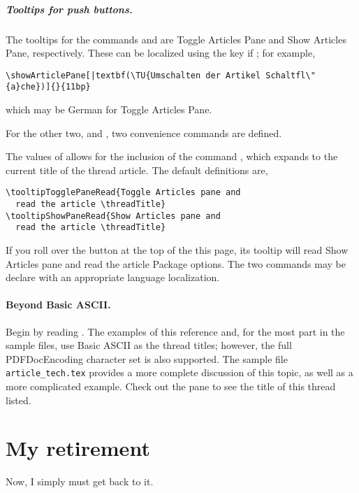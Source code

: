 \documentclass{article}
\begin{document}
\subparagraph*{Tooltips for push buttons.} The tooltips for the commands
 and  are \textsf{Toggle Articles
Pane} and \textsf{Show Articles Pane}, respectively. These can be localized
using the  key if ; for example,
\begin{Verbatim}[xleftmargin=\amtIndent,fontsize=\small,commandchars={|()}]
\showArticlePane[|textbf(\TU{Umschalten der Artikel Schaltfl\"{a}che})]{}{11bp}
\end{Verbatim}
which may be German for \textsf{Toggle Articles Pane}.

For the other two,  and , two convenience
commands are defined.
\bVerb{}%
\begin{dCmd}[commandchars=!()]{\bxSize}
}
\end{dCmd}
\eVerb The values of  allows for the inclusion of the command
, which expands to the current title of the thread article.
The default definitions are,
\begin{Verbatim}[xleftmargin=\amtIndent]
\tooltipTogglePaneRead{Toggle Articles pane and
  read the article \threadTitle}
\tooltipShowPaneRead{Show Articles pane and
  read the article \threadTitle}
\end{Verbatim}
If you roll over the button at the top of the this page, its tooltip will read \textsf{Show Articles pane and
  read the article Package options}. The two commands may be declare with an appropriate language localization.


\noindent{}%
\paragraph*{Beyond Basic ASCII.} Begin by reading .
The examples of this reference and, for the most part in the sample
files, use Basic ASCII as the thread titles; however, the full PDFDocEncoding
character set is also supported. The sample file \texttt{article\_tech.tex}
provides a more complete discussion of this topic, as well as a more
complicated example. Check out the
 pane to
see the title of this thread listed.

\section{My retirement}

Now, I simply must get back to it. \dps
\end{document}
